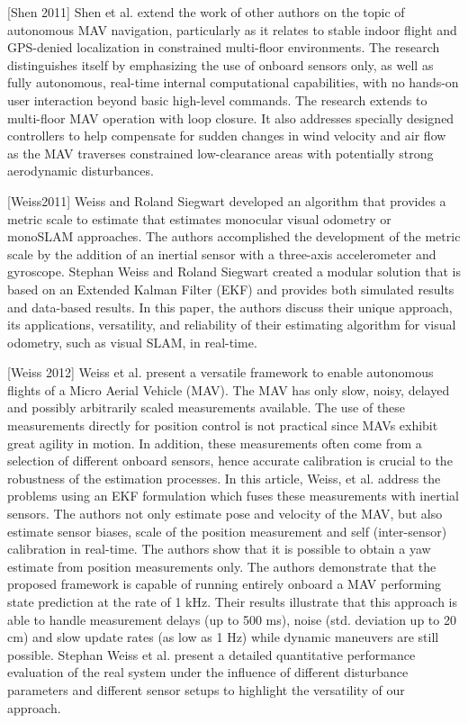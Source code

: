 [Shen 2011] Shen et al. extend the work of other authors on the topic of autonomous MAV navigation, particularly as it relates to stable indoor flight and GPS-denied localization in constrained multi-floor environments. The research distinguishes itself by emphasizing the use of onboard sensors only, as well as fully autonomous, real-time internal computational capabilities, with no hands-on user interaction beyond basic high-level commands. The research extends to multi-floor MAV operation with loop closure. It also addresses specially designed controllers to help compensate for sudden changes in wind velocity and air flow as the MAV traverses constrained low-clearance areas with potentially strong aerodynamic disturbances.

[Weiss2011] Weiss and Roland Siegwart developed an algorithm that provides a metric scale to estimate that estimates monocular visual odometry or monoSLAM approaches. The authors accomplished the development of the metric scale by the addition of an inertial sensor with a three-axis accelerometer and gyroscope. Stephan Weiss and Roland Siegwart created a modular solution that is based on an Extended Kalman Filter (EKF) and provides both simulated results and data-based results. In this paper, the authors discuss their unique approach, its applications, versatility, and reliability of their estimating algorithm for visual odometry, such as visual SLAM, in real-time. 

[Weiss 2012] Weiss et al. present a versatile framework to enable autonomous flights of a Micro Aerial Vehicle (MAV). The MAV has only slow, noisy, delayed and possibly arbitrarily scaled measurements available. The use of these measurements directly for position control is not practical since MAVs exhibit great agility in motion. In addition, these measurements often come from a selection of different onboard sensors, hence accurate calibration is crucial to the robustness of the estimation processes. In this article, Weiss, et al. address the problems using an EKF formulation which fuses these measurements with inertial sensors. The authors not only estimate pose and velocity of the MAV, but also estimate sensor biases, scale of the position measurement and self (inter-sensor) calibration in real-time. The authors show that it is possible to obtain a yaw estimate from position measurements only. The authors demonstrate that the proposed framework is capable of running entirely onboard a MAV performing state prediction at the rate of 1 kHz. Their results illustrate that this approach is able to handle measurement delays (up to 500 ms), noise (std. deviation up to 20 cm) and slow update rates (as low as 1 Hz) while dynamic maneuvers are still possible. Stephan Weiss et al. present a detailed quantitative performance evaluation of the real system under the influence of different disturbance parameters and different sensor setups to highlight the versatility of our approach. 

